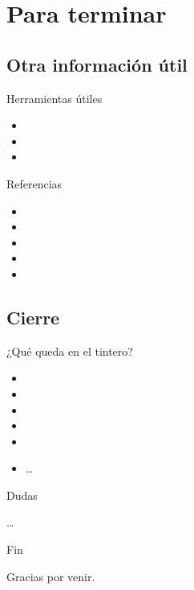 \section*{Para terminar}
\subsection*{Otra información útil}
\begin{frame}{Herramientas útiles}
  \begin{itemize}
    \item 
    \item 
    \item 
  \end{itemize}
\end{frame}

\begin{frame}{Referencias}
  \begin{itemize}
    \item 
    \item 
    \item 
    \item 
    \item 
  \end{itemize}
\end{frame}

\subsection*{Cierre}

\begin{frame}{¿Qué queda en el tintero?}
  \begin{itemize}
    \item 
    \item 
    \item 
    \item 
    \item 
    \item \dots
  \end{itemize}
\end{frame}

\begin{frame}{Dudas}
  \begin{center}
    \dots
  \end{center}
\end{frame}

\begin{frame}{Fin}
  \begin{center}
    Gracias por venir.
  \end{center}
\end{frame}
